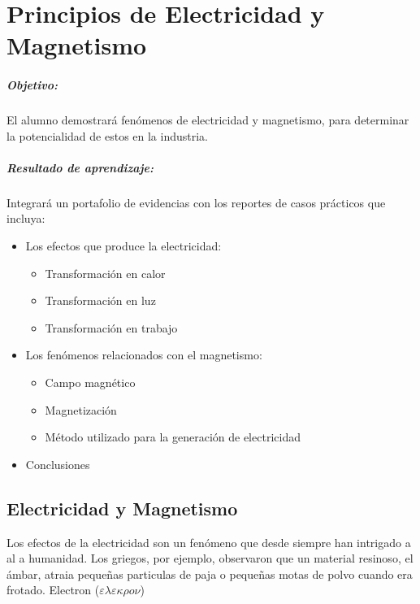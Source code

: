 \chapter{Principios de Electricidad y Magnetismo}
\paragraph{Objetivo:}
El alumno demostrará fenómenos de electricidad y magnetismo,
para determinar la potencialidad de estos en la industria.

\paragraph{Resultado de aprendizaje:}
Integrará un portafolio de evidencias con los reportes de casos prácticos que incluya: 
\begin{itemize}
	\item Los efectos que produce la electricidad:
	\begin{itemize}
		\item Transformación en calor
		\item Transformación en luz
		\item Transformación en trabajo
	\end{itemize}
	\item Los fenómenos relacionados con el magnetismo:
	\begin{itemize}
		\item Campo magnético
		\item Magnetización
		\item Método utilizado para la generación de electricidad
	\end{itemize}
	\item Conclusiones
\end{itemize}
 
\section{Electricidad y Magnetismo}
Los efectos de la electricidad son un fenómeno que desde siempre han intrigado a al a humanidad. Los griegos, por ejemplo, observaron que un material resinoso, el ámbar, atraia pequeñas particulas de paja o pequeñas motas de polvo cuando era frotado. Electron ($\varepsilon \lambda \varepsilon \kappa \rho o \nu $)